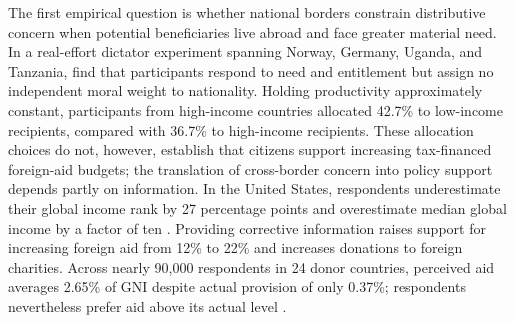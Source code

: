 The first empirical question is whether national borders constrain distributive concern when potential beneficiaries live abroad and face greater material need. In a real-effort dictator experiment spanning Norway, Germany, Uganda, and Tanzania, \citet{cappelen_needs_2013} find that participants respond to need and entitlement %
but assign no independent moral weight to nationality. Holding productivity approximately constant, participants from high-income countries allocated 42.7\% to low-income recipients, compared with 36.7\% to high-income recipients. These allocation choices do not, however, establish that citizens support increasing tax-financed foreign-aid budgets; the translation of cross-border concern into policy support depends partly on information. %
In the United States, respondents underestimate their global income rank by 27 percentage points and overestimate median global income by a factor of ten \citep{nair_misperceptions_2018}. %
Providing corrective information raises support for increasing foreign aid from 12\% to 22\% and increases donations to foreign charities. %
Across nearly 90,000 respondents in 24 donor countries, perceived aid averages 2.65\% of GNI despite actual provision of only 0.37\%; respondents nevertheless prefer aid above its actual level \citep{kaufmann_foreign_2019}. %

